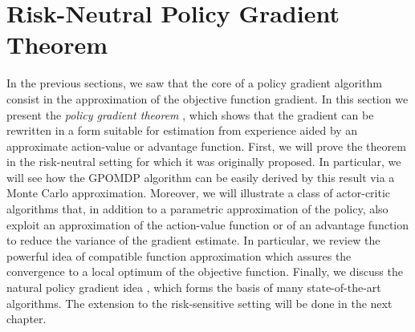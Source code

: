 \section{Risk-Neutral Policy Gradient Theorem}
In the previous sections, we saw that the core of a policy gradient algorithm consist in the approximation of the objective function gradient. In this section we present the \emph{policy gradient theorem} \cite{sutton1999policy}, which shows that the gradient can be rewritten in a form suitable for estimation from experience aided by an approximate action-value or advantage function. First, we will prove the theorem in the risk-neutral setting for which it was originally proposed. In particular, we will see how the GPOMDP algorithm can be easily derived by this result via a Monte Carlo approximation. Moreover, we will illustrate a class of actor-critic algorithms \cite{konda1999actor} that, in addition to a parametric approximation of the policy, also exploit an approximation of the action-value function or of an advantage function to reduce the variance of the gradient estimate. In particular, we review the powerful idea of compatible function approximation \cite{sutton1999policy} which assures the convergence to a local optimum of the objective function. Finally, we discuss the natural policy gradient idea \cite{kakade2001natural}, which forms the basis of many state-of-the-art algorithms. The extension to the risk-sensitive setting will be done in the next chapter. 

